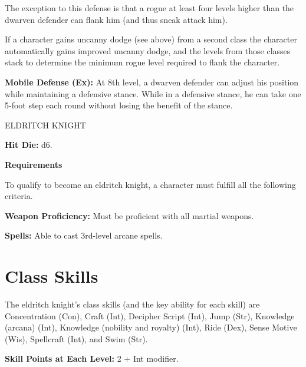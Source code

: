 \documentclass{article}
\begin{document}
The exception to this defense is that a rogue at least four levels higher than 
the dwarven defender can flank him (and thus sneak attack him).

If a character gains uncanny dodge (see above) from a second class the character 
automatically gains improved uncanny dodge, and the levels from those classes stack 
to determine the minimum rogue level required to flank the character.

\textbf{Mobile Defense (Ex):} At 8th level, a dwarven defender can adjust his position 
while maintaining a defensive stance. While in a defensive stance, he can take 
one 5-foot step each round without losing the benefit of the stance.

\vspace{12pt}
ELDRITCH KNIGHT

\textbf{Hit Die:} d6.

\textbf{Requirements}

To qualify to become an eldritch knight, a character must fulfill all the following 
criteria.

\textbf{Weapon Proficiency:} Must be proficient with all martial weapons.

\textbf{Spells:} Able to cast 3rd-level arcane spells.

\section*{\textbf{Class Skills}}

The eldritch knight's class skills (and the key ability for each skill) are Concentration 
(Con), Craft (Int), Decipher Script (Int), Jump (Str), Knowledge (arcana) (Int), 
Knowledge (nobility and royalty) (Int), Ride (Dex), Sense Motive (Wis), Spellcraft 
(Int), and Swim (Str).  

\parindent=3pt
\textbf{Skill Points at Each Level:} 2 + Int modifier.
\end{document}
